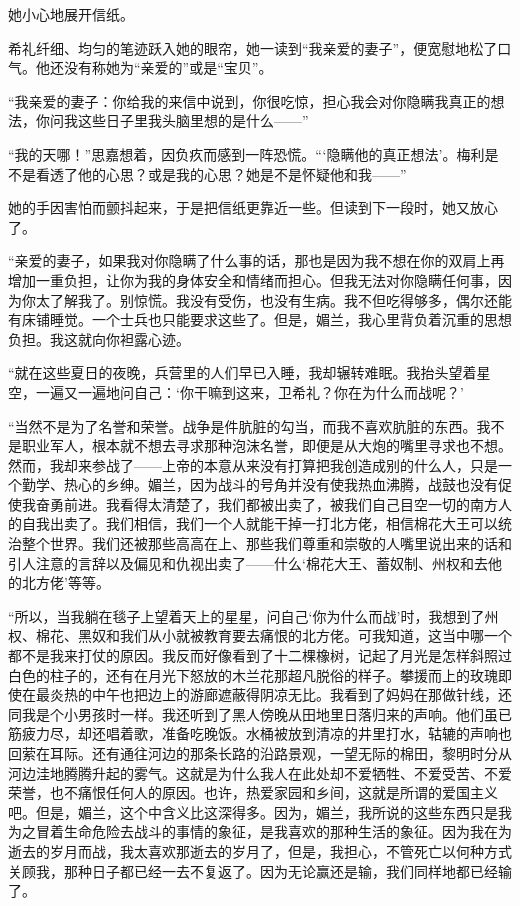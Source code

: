 \par 她小心地展开信纸。
\par 希礼纤细、均匀的笔迹跃入她的眼帘，她一读到“我亲爱的妻子”，便宽慰地松了口气。他还没有称她为“亲爱的”或是“宝贝”。
\par “我亲爱的妻子：你给我的来信中说到，你很吃惊，担心我会对你隐瞒我真正的想法，你问我这些日子里我头脑里想的是什么——”
\par “我的天哪！”思嘉想着，因负疚而感到一阵恐慌。“‘隐瞒他的真正想法’。梅利是不是看透了他的心思？或是我的心思？她是不是怀疑他和我——”
\par 她的手因害怕而颤抖起来，于是把信纸更靠近一些。但读到下一段时，她又放心了。
\par “亲爱的妻子，如果我对你隐瞒了什么事的话，那也是因为我不想在你的双肩上再增加一重负担，让你为我的身体安全和情绪而担心。但我无法对你隐瞒任何事，因为你太了解我了。别惊慌。我没有受伤，也没有生病。我不但吃得够多，偶尔还能有床铺睡觉。一个士兵也只能要求这些了。但是，媚兰，我心里背负着沉重的思想负担。我这就向你袒露心迹。
\par “就在这些夏日的夜晚，兵营里的人们早已入睡，我却辗转难眠。我抬头望着星空，一遍又一遍地问自己：‘你干嘛到这来，卫希礼？你在为什么而战呢？’
\par “当然不是为了名誉和荣誉。战争是件肮脏的勾当，而我不喜欢肮脏的东西。我不是职业军人，根本就不想去寻求那种泡沫名誉，即便是从大炮的嘴里寻求也不想。然而，我却来参战了——上帝的本意从来没有打算把我创造成别的什么人，只是一个勤学、热心的乡绅。媚兰，因为战斗的号角并没有使我热血沸腾，战鼓也没有促使我奋勇前进。我看得太清楚了，我们都被出卖了，被我们自己目空一切的南方人的自我出卖了。我们相信，我们一个人就能干掉一打北方佬，相信棉花大王可以统治整个世界。我们还被那些高高在上、那些我们尊重和崇敬的人嘴里说出来的话和引人注意的言辞以及偏见和仇视出卖了——什么‘棉花大王、蓄奴制、州权和去他的北方佬’等等。
\par “所以，当我躺在毯子上望着天上的星星，问自己‘你为什么而战’时，我想到了州权、棉花、黑奴和我们从小就被教育要去痛恨的北方佬。可我知道，这当中哪一个都不是我来打仗的原因。我反而好像看到了十二棵橡树，记起了月光是怎样斜照过白色的柱子的，还有在月光下怒放的木兰花那超凡脱俗的样子。攀援而上的玫瑰即使在最炎热的中午也把边上的游廊遮蔽得阴凉无比。我看到了妈妈在那做针线，还同我是个小男孩时一样。我还听到了黑人傍晚从田地里日落归来的声响。他们虽已筋疲力尽，却还唱着歌，准备吃晚饭。水桶被放到清凉的井里打水，轱辘的声响也回萦在耳际。还有通往河边的那条长路的沿路景观，一望无际的棉田，黎明时分从河边洼地腾腾升起的雾气。这就是为什么我人在此处却不爱牺牲、不爱受苦、不爱荣誉，也不痛恨任何人的原因。也许，热爱家园和乡间，这就是所谓的爱国主义吧。但是，媚兰，这个中含义比这深得多。因为，媚兰，我所说的这些东西只是我为之冒着生命危险去战斗的事情的象征，是我喜欢的那种生活的象征。因为我在为逝去的岁月而战，我太喜欢那逝去的岁月了，但是，我担心，不管死亡以何种方式关顾我，那种日子都已经一去不复返了。因为无论赢还是输，我们同样地都已经输了。
